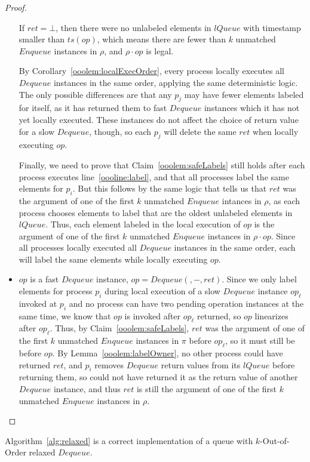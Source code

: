 \documentclass[a4paper,anonymous,USenglish]{lipics-v2021}
\theoremstyle{definition}
\begin{document}
\begin{proof}
\begin{itemize}
    If $ret = \bot$, then there were no unlabeled elements in $lQueue$ with timestamp smaller than $ts(op)$, which means there are fewer than $k$ unmatched $Enqueue$ instances in $\rho$, and $\rho \cdot op$ is legal.

    By Corollary~\ref{ooolem:localExecOrder}, every process locally executes all $Dequeue$ instances in the same order, applying the same deterministic logic.  The only possible differences are that any $p_j$ may have fewer elements labeled for itself, as it has returned them to fast $Dequeue$ instances which it has not yet locally executed.  These instances do not affect the choice of return value for a slow $Dequeue$, though, so each $p_j$ will delete the same $ret$ when locally executing $op$.  

    Finally, we need to prove that Claim~\ref{ooolem:safeLabels} still holds after each process executes line~\ref{oooline:label}, and that all processes label the same elements for $p_i$.  But this follows by the same logic that tells us that $ret$ was the argument of one of the first $k$ unmatched $Enqueue$ intances in $\rho$, as each process chooses elements to label that are the oldest unlabeled elements in $lQueue$.  Thus, each element labeled in the local execution of $op$ is the argument of one of the first $k$ unmatched $Enqueue$ instances in $\rho \cdot op$.  Since all processes locally executed all $Dequeue$ instances in the same order, each will label the same elements while locally executing $op$.
%
  \item $op$ is a fast $Dequeue$ instance, $op = Dequeue(,-,ret)$.  Since we only label elements for process $p_i$ during local execution of a slow $Dequeue$ instance $op_\ell$ invoked at $p_i$ and no process can have two pending operation instances at the same time, we know that $op$ is invoked after $op_\ell$ returned, so $op$ linearizes after $op_\ell$.  Thus, by Claim~\ref{ooolem:safeLabels}, $ret$ was the argument of one of the first $k$ unmatched $Enqueue$ instances in $\pi$ before $op_\ell$, so it must still be before $op$.  By Lemma~\ref{ooolem:labelOwner}, no other process could have returned $ret$, and $p_i$ removes $Dequeue$ return values from its $lQueue$ before returning them, so could not have returned it as the return value of another $Dequeue$ instance, and thus $ret$ is still the argument of one of the first $k$ unmatched $Enqueue$ instances in $\rho$.
  \end{itemize}
\end{proof}

\begin{theorem}
  Algorithm~\ref{alg:relaxed} is a correct implementation of a queue with $k$-Out-of-Order relaxed $Dequeue$.
\end{theorem}
\end{document}
